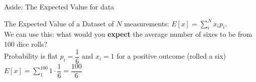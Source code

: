 \documentclass[10pt,sans,english,compress,xcolor=dvipsnames]{beamer}
\begin{document}
\begin{frame}[fragile]{Aside: The Expected Value for data }


The Expected Value of a Dataset of $N$ measurements: $E[x] =  \sum\limits_i^N x_{i} p_i$.\\[1ex]

We can use this: what would you \textbf{expect} the average number of sixes to be from 100 dice rolls?\\[1ex]

Probability is flat $p_i = \dfrac{1}{6}$  and $x_{i} =1$ for a positive outcome (rolled a six)\\[1ex]

$E[x] =  \sum\limits_1^{100}  1\cdot\dfrac{1}{6} = \dfrac{100}{6} $\\[1ex]


\end{frame}


%
%
%
%
%
%
%
\end{document}
